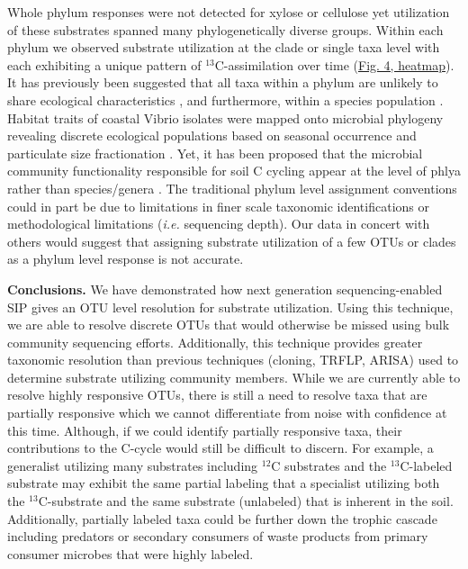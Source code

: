 Whole phylum responses were not detected for xylose or cellulose yet
utilization of these substrates spanned many phylogenetically diverse groups.
Within each phylum we observed substrate utilization at the clade or single
taxa level with each exhibiting a unique pattern of $^{13}$C-assimilation over
time
(\href{https://authorea.com/users/3537/articles/3612/master/file/figures/bacteria_tree/bacteria_tree.png}{Fig.
4, heatmap}). It has previously been suggested that all taxa within a phylum
are unlikely to share ecological characteristics \citep{Fierer_2007}, and
furthermore, within a species population
\citep{Choudoir_2012,Preheim_2011,Hunt_2008}. Habitat traits of coastal Vibrio
isolates were mapped onto microbial phylogeny revealing discrete ecological
populations based on seasonal occurrence and particulate size fractionation
\citep{Preheim_2011,Hunt_2008}. Yet, it has been proposed that the microbial
community functionality responsible for soil C cycling appear at the level of
phlya rather than species/genera \citep{Schimel_2012}. The traditional phylum
level assignment conventions could in part be due to limitations in finer scale
taxonomic identifications or methodological limitations (\textit{i.e.}
sequencing depth). Our data in concert with others
\citep{Goldfarb_2011,Fierer_2007,Choudoir_2012,Preheim_2011,Hunt_2008} would
suggest that assigning substrate utilization of a few OTUs or clades as a
phylum level response is not accurate.

\textbf{Conclusions.} We have demonstrated how next generation
sequencing-enabled SIP gives an OTU level resolution for substrate utilization.
Using this technique, we are able to resolve discrete OTUs that would otherwise
be missed using bulk community sequencing efforts. Additionally, this technique
provides greater taxonomic resolution than previous techniques (cloning, TRFLP,
ARISA) used to determine substrate utilizing community members. While we are
currently able to resolve highly responsive OTUs, there is still a need to
resolve taxa that are partially responsive which we cannot differentiate from
noise with confidence at this time. Although, if we could identify partially
responsive taxa, their contributions to the C-cycle would still be difficult to
discern. For example, a generalist utilizing many substrates including $^{12}$C
substrates and the $^{13}$C-labeled substrate may exhibit the same partial
labeling that a specialist utilizing both the $^{13}$C-substrate and the same
substrate (unlabeled) that is inherent in the soil. Additionally, partially
labeled taxa could be further down the trophic cascade including predators or
secondary consumers of waste products from primary consumer microbes that were
highly labeled.   

